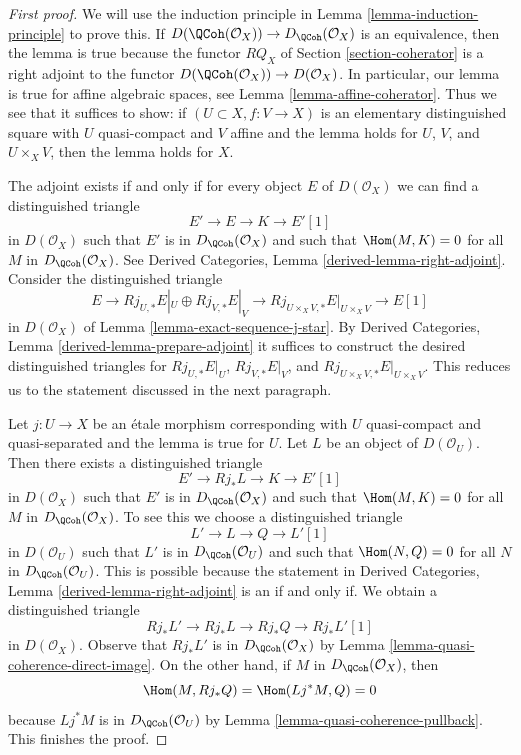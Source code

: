 \begin{proof}[First proof]
We will use the induction principle in
Lemma \ref{lemma-induction-principle}
to prove this. If $D(\QCoh(\mathcal{O}_X)) \to D_\QCoh(\mathcal{O}_X)$
is an equivalence, then the lemma is true because the functor
$RQ_X$ of Section \ref{section-coherator} is a right adjoint to the functor
$D(\QCoh(\mathcal{O}_X)) \to D(\mathcal{O}_X)$.
In particular, our lemma is true for affine algebraic spaces, see
Lemma \ref{lemma-affine-coherator}.
Thus we see that it suffices to show: if $(U \subset X, f : V \to X)$
is an elementary distinguished square with $U$ quasi-compact
and $V$ affine and the lemma holds for $U$, $V$, and $U \times_X V$,
then the lemma holds for $X$.

\medskip\noindent
The adjoint exists if and only if for every object $E$ of
$D(\mathcal{O}_X)$ we can find a distinguished triangle
$$
E' \to E \to K \to E'[1]
$$
in $D(\mathcal{O}_X)$
such that $E'$ is in $D_\QCoh(\mathcal{O}_X)$ and such that
$\Hom(M, K) = 0$ for all $M$ in $D_\QCoh(\mathcal{O}_X)$. See
Derived Categories, Lemma \ref{derived-lemma-right-adjoint}.
Consider the distinguished triangle
$$
E \to Rj_{U, *}E|_U \oplus Rj_{V, *}E|_V \to
Rj_{U \times_X V, *}E|_{U \times_X V} \to E[1]
$$
in $D(\mathcal{O}_X)$ of Lemma \ref{lemma-exact-sequence-j-star}.
By Derived Categories, Lemma \ref{derived-lemma-prepare-adjoint}
it suffices to construct the desired distinguished triangles
for $Rj_{U, *}E|_U$, $Rj_{V, *}E|_V$, and
$Rj_{U \times_X V, *}E|_{U \times_X V}$. This reduces us to the statement
discussed in the next paragraph.

\medskip\noindent
Let $j : U \to X$ be an \'etale morphism corresponding with
$U$ quasi-compact and quasi-separated and the lemma is true for $U$.
Let $L$ be an object of $D(\mathcal{O}_U)$.
Then there exists a distinguished triangle
$$
E' \to Rj_*L \to K \to E'[1]
$$
in $D(\mathcal{O}_X)$
such that $E'$ is in $D_\QCoh(\mathcal{O}_X)$ and such that
$\Hom(M, K) = 0$ for all $M$ in $D_\QCoh(\mathcal{O}_X)$.
To see this we choose a distinguished triangle
$$
L' \to L \to Q \to L'[1]
$$
in $D(\mathcal{O}_U)$ such that $L'$ is in $D_\QCoh(\mathcal{O}_U)$
and such that $\Hom(N, Q) = 0$ for all $N$ in $D_\QCoh(\mathcal{O}_U)$.
This is possible because the statement in
Derived Categories, Lemma \ref{derived-lemma-right-adjoint}
is an if and only if.
We obtain a distinguished triangle
$$
Rj_*L' \to Rj_*L \to Rj_*Q \to Rj_*L'[1]
$$
in $D(\mathcal{O}_X)$. Observe that $Rj_*L'$ is in $D_\QCoh(\mathcal{O}_X)$
by Lemma \ref{lemma-quasi-coherence-direct-image}.
On the other hand, if $M$ in $D_\QCoh(\mathcal{O}_X)$, then
$$
\Hom(M, Rj_*Q) = \Hom(Lj^*M, Q) = 0
$$
because $Lj^*M$ is in $D_\QCoh(\mathcal{O}_U)$ by
Lemma \ref{lemma-quasi-coherence-pullback}.
This finishes the proof.
\end{proof}

